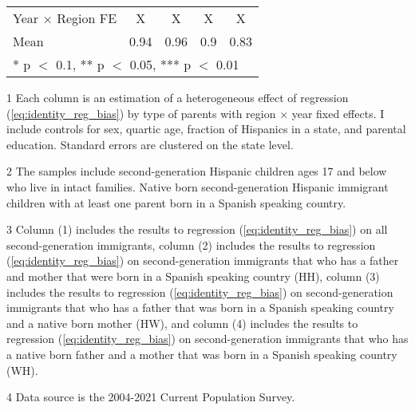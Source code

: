 \begin{table}[H]
{\begin{threeparttable}
\begin{tabular}[t]{lcccc}
Year $\times$ Region FE & X & X & X & X\\
Mean & \num{0.94} & \num{0.96} & \num{0.9} & \num{0.83}\\
\bottomrule
\multicolumn{5}{l}{\rule{0pt}{1em}* p $<$ 0.1, ** p $<$ 0.05, *** p $<$ 0.01}\\
\end{tabular}
\begin{tablenotes}
\small
\item[1] \footnotesize{Each column is an estimation of a heterogeneous effect of regression (\ref{eq:identity_reg_bias}) by 
                      type of parents with region × year fixed effects. 
                      I include controls for sex, quartic age, fraction of Hispanics in a state, and parental education.
                      Standard errors are clustered on the state level.}
\item[2] \footnotesize{The samples include second-generation Hispanic children ages 17 and below who live in intact families. 
                      Native born second-generation Hispanic 
                      immigrant children with at least one parent born in a Spanish speaking 
                      country.}
\item[3] \footnotesize{Column (1) includes the results to regression (\ref{eq:identity_reg_bias}) on all second-generation immigrants, 
                                        column (2) includes the results to regression (\ref{eq:identity_reg_bias}) on second-generation immigrants that who has a father and mother that were born in a Spanish speaking country (HH),
                                        column (3) includes the results to regression (\ref{eq:identity_reg_bias}) on second-generation immigrants that who has a father that was born in a Spanish speaking country and a native born mother (HW), and
                                        column (4) includes the results to regression (\ref{eq:identity_reg_bias}) on second-generation immigrants that who has a native born father and a mother that was born in a Spanish speaking country (WH).}
\item[4] \footnotesize{Data source is the 2004-2021 Current Population Survey.}
\end{tablenotes}
\end{threeparttable}}
\end{table}
